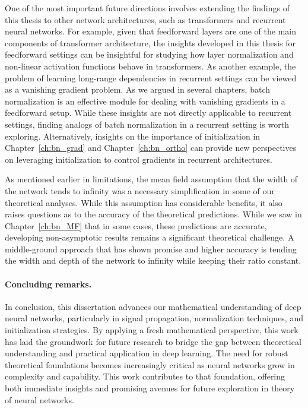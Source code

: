 One of the most important future directions involves extending the findings of this thesis to other network architectures, such as transformers and recurrent neural networks. For example, given that feedforward layers are one of the main components of transformer architecture, the insights developed in this thesis for feedforward settings can be insightful for studying how layer normalization and non-linear activation functions behave in transformers. As another example, the problem of learning long-range dependencies in recurrent settings can be viewed as a vanishing gradient problem. As we argued in several chapters, batch normalization is an effective module for dealing with vanishing gradients in a feedforward setup. While these insights are not directly applicable to recurrent settings, finding analogs of batch normalization in a recurrent setting is worth exploring. Alternatively, insights on the importance of initialization in Chapter~\ref{ch:bn_grad} and Chapter~\ref{ch:bn_ortho} can provide new perspectives on leveraging initialization to control gradients in recurrent architectures.


As mentioned earlier in limitations, the mean field assumption that the width of the network tends to infinity was a necessary simplification in some of our theoretical analyses. While this assumption has considerable benefits, it also raises questions as to the accuracy of the theoretical predictions. While we saw in Chapter~\ref{ch:bn_MF} that in some cases, these predictions are accurate, developing non-asymptotic results remains a significant theoretical challenge. A middle-ground approach that has shown promise and higher accuracy is tending the width and depth of the network to infinity while keeping their ratio constant. 



\paragraph{Concluding remarks.}
In conclusion, this dissertation advances our mathematical understanding of deep neural networks, particularly in signal propagation, normalization techniques, and initialization strategies. By applying a fresh mathematical perspective, this work has laid the groundwork for future research to bridge the gap between theoretical understanding and practical application in deep learning. 
The need for robust theoretical foundations becomes increasingly critical as neural networks grow in complexity and capability. This work contributes to that foundation, offering both immediate insights and promising avenues for future exploration in theory of neural networks. 